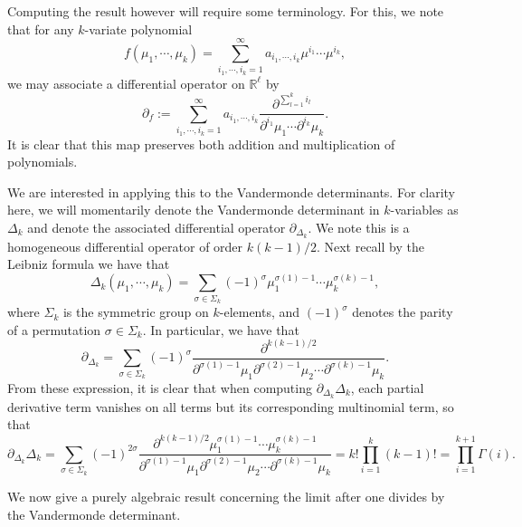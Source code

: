 \documentclass[12pt]{article}
\newcommand{\R}{\mathbb{R}}
\numberwithin{info}{section}
\numberwithin{equation}{section}
\renewcommand{\[}{\begin{equation}}
\renewcommand{\]}{\end{equation}}
\newcommand{\<}{\langle}
\renewcommand{\>}{\rangle}
\begin{document}
	Computing the result however will require some terminology. For this, we note that for any $k$-variate polynomial 
	\[f(\mu_1,\cdots,\mu_k)=\sum_{i_1,\cdots,i_k=1}^{\infty}a_{i_1,\cdots,i_k}\mu^{i_1}\cdots \mu^{i_k},\]
	we may associate a differential operator on $\R^\ell$ by
	\[\partial_f:=\sum_{i_1,\cdots,i_k=1}^{\infty}a_{i_1,\cdots,i_k}\frac{\partial^{\sum_{l=1}^k i_l}}{\partial^{i_1} \mu_1\cdots \partial^{i_k} \mu_k}.\]
	It is clear that this map preserves both addition and multiplication of polynomials.
	
	We are interested in applying this to the Vandermonde determinants. For clarity here, we will momentarily denote the Vandermonde determinant in $k$-variables as $\Delta_k$ and denote the associated differential operator $\partial_{\Delta_k}$. We note this is a homogeneous differential operator of order $k(k-1)/2$. Next recall by the Leibniz formula we have that
	\[\Delta_k(\mu_1,\cdots, \mu_k)=\sum_{\sigma\in \Sigma_k}(-1)^{\sigma}\mu^{\sigma(1)-1}_1\cdots \mu^{\sigma(k)-1}_k,\]
	where $\Sigma_k$ is the symmetric group on $k$-elements, and $(-1)^\sigma$ denotes the parity of a permutation $\sigma\in \Sigma_k$. In particular, we have that
	\[\partial_{\Delta_k}=\sum_{\sigma\in \Sigma_k}(-1)^{\sigma}\frac{\partial^{k(k-1)/2}}{\partial^{\sigma(1)-1}  \mu_{1}\partial^{\sigma(2)-1}  \mu_{2}\cdots \partial^{\sigma(k)-1}  \mu_{k}}.\]
	From these expression, it is clear that when computing $\partial_{\Delta_k}\Delta_k$, each partial derivative term vanishes on all terms but its corresponding multinomial term, so that
	\[\partial_{\Delta_k}\Delta_k=\sum_{\sigma\in \Sigma_k}(-1)^{2\sigma}\frac{\partial^{k(k-1)/2}\mu^{\sigma(1)-1}_1\cdots \mu^{\sigma(k)-1}_k}{\partial^{\sigma(1)-1}  \mu_{1}\partial^{\sigma(2)-1}  \mu_{2}\cdots \partial^{\sigma(k)-1}  \mu_{k}}=k!\prod_{i=1}^{k}(k-1)!=\prod_{i=1}^{k+1}\Gamma(i).\label{eqn:Delta_k constant}\]
	
	We now give a purely algebraic result concerning the limit after one divides by the Vandermonde determinant.
	
\end{document}
